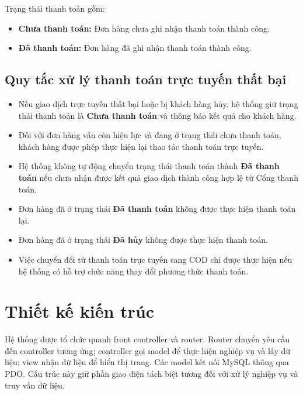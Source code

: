 Trạng thái thanh toán gồm:

\begin{itemize}
    \item \textbf{Chưa thanh toán:} Đơn hàng chưa ghi nhận thanh toán thành công.
    \item \textbf{Đã thanh toán:} Đơn hàng đã ghi nhận thanh toán thành công.
\end{itemize}

\subsection{Quy tắc xử lý thanh toán trực tuyến thất bại}

\begin{itemize}
    \item Nếu giao dịch trực tuyến thất bại hoặc bị khách hàng hủy, hệ thống giữ trạng thái thanh toán là \textbf{Chưa thanh toán} và thông báo kết quả cho khách hàng.

    \item Đối với đơn hàng vẫn còn hiệu lực và đang ở trạng thái chưa thanh toán, khách hàng được phép thực hiện lại thao tác thanh toán trực tuyến.

    \item Hệ thống không tự động chuyển trạng thái thanh toán thành \textbf{Đã thanh toán} nếu chưa nhận được kết quả giao dịch thành công hợp lệ từ Cổng thanh toán.

    \item Đơn hàng đã ở trạng thái \textbf{Đã thanh toán} không được thực hiện thanh toán lại.

    \item Đơn hàng đã ở trạng thái \textbf{Đã hủy} không được thực hiện thanh toán.

    \item Việc chuyển đổi từ thanh toán trực tuyến sang COD chỉ được thực hiện nếu hệ thống có hỗ trợ chức năng thay đổi phương thức thanh toán.
\end{itemize}

\section{Thiết kế kiến trúc}
Hệ thống được tổ chức quanh front controller và router. Router chuyển yêu cầu đến controller tương ứng; controller gọi model để thực hiện nghiệp vụ và lấy dữ liệu; view nhận dữ liệu để hiển thị trang. Các model kết nối MySQL thông qua PDO. Cấu trúc này giữ phần giao diện tách biệt tương đối với xử lý nghiệp vụ và truy vấn dữ liệu.

